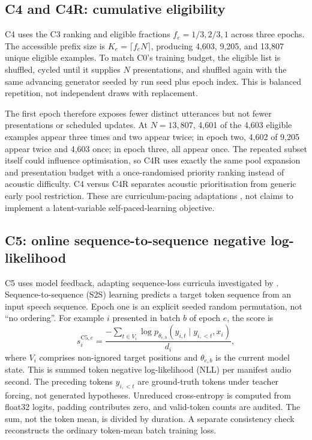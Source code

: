 \documentclass[12pt,a4paper]{report}
\begin{document}
\subsection{C4 and C4R: cumulative eligibility}

C4 uses the C3 ranking and eligible fractions $f_e=1/3,2/3,1$ across three epochs. The accessible prefix size is $K_e=\lceil f_eN\rceil$, producing 4,603, 9,205, and 13,807 unique eligible examples. To match C0's training budget, the eligible list is shuffled, cycled until it supplies $N$ presentations, and shuffled again with the same advancing generator seeded by run seed plus epoch index. This is balanced repetition, not independent draws with replacement.

The first epoch therefore exposes fewer distinct utterances but not fewer presentations or scheduled updates. At $N=13,807$, 4,601 of the 4,603 eligible examples appear three times and two appear twice; in epoch two, 4,602 of 9,205 appear twice and 4,603 once; in epoch three, all appear once. The repeated subset itself could influence optimisation, so C4R uses exactly the same pool expansion and presentation budget with a once-randomised priority ranking instead of acoustic difficulty. C4 versus C4R separates acoustic prioritisation from generic early pool restriction. These are curriculum-pacing adaptations \citep{Bengio2009}, not claims to implement a latent-variable self-paced-learning objective.

\subsection{C5: online sequence-to-sequence negative log-likelihood}

C5 uses model feedback, adapting sequence-loss curricula investigated by \citet{Karakasidis2022}. Sequence-to-sequence (S2S) learning predicts a target token sequence from an input speech sequence. Epoch one is an explicit seeded random permutation, not ``no ordering''. For example $i$ presented in batch $b$ of epoch $e$, the score is
\begin{equation}
s_i^{\mathrm{C5},e}=\frac{-\sum_{t\in V_i}\log p_{\theta_{e,b}}(y_{i,t}\mid y_{i,<t},x_i)}{d_i},
\label{eq:s2s}
\end{equation}
where $V_i$ comprises non-ignored target positions and $\theta_{e,b}$ is the current model state. This is summed token negative log-likelihood (NLL) per manifest audio second. The preceding tokens $y_{i,<t}$ are ground-truth tokens under teacher forcing, not generated hypotheses. Unreduced cross-entropy is computed from float32 logits, padding contributes zero, and valid-token counts are audited. The sum, not the token mean, is divided by duration. A separate consistency check reconstructs the ordinary token-mean batch training loss.
\end{document}
